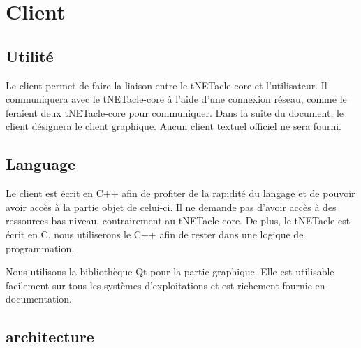 ﻿\section{Client}
\subsection{Utilité}
Le client permet de faire la liaison entre le tNETacle-core et l'utilisateur.
Il communiquera avec le tNETacle-core à l'aide d'une connexion réseau,
comme le feraient deux tNETacle-core pour communiquer.
Dans la suite du document, le client désignera le client graphique.
Aucun client textuel officiel ne sera fourni.

\subsection{Language}
Le client est écrit en C++ afin de profiter de la rapidité du langage et de pouvoir avoir accès à la partie objet de celui-ci.
Il ne demande pas d'avoir accès à des ressources bas niveau, contrairement au tNETacle-core.
De plus, le tNETacle est écrit en C, nous utiliserons le C++ afin de rester dans une logique de programmation.

Nous utilisons la bibliothèque Qt pour la partie graphique.
Elle est utilisable facilement sur tous les systèmes d'exploitations et est richement fournie en documentation.

\subsection{architecture}

